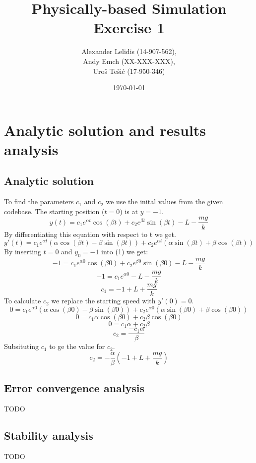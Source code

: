 \documentclass{article}
\title{Physically-based Simulation \\ Exercise 1}
\author{ 
    Alexander Lelidis (14-907-562), \\
    Andy Emch (XX-XXX-XXX), \\
    Uro\v{s} Te\v{s}i\'{c} (17-950-346)
}
\date{\today}
\begin{document}
\maketitle

\section{Analytic solution and results analysis}
\subsection{Analytic solution}
To find the parameters $c_1$ and $c_2$ we use the inital values from the given codebase. The starting position ($t = 0$) is at $y = -1$.
\begin{equation}
    y(t) = c_1 e^{\alpha  t} \cos(\beta t) + c_2 e^{\beta  t} \sin(\beta t) - L - \frac{mg}{k}
\end{equation}
By  differentiating this equation with respect to t we get.
\begin{equation}
    y'(t) = c_1 e^{\alpha  t} (\alpha \cos(\beta t) - \beta \sin(\beta t) )+ c_2 e^{\alpha  t} (\alpha \sin(\beta t) + \beta \cos(\beta t)) 
\end{equation}
By inserting $t = 0$ and $y_0 = -1$ into (1) we get:
\begin{equation}
    -1 = c_1 e^{\alpha  0} \cos(\beta 0) + c_2 e^{\beta  0} \sin(\beta 0) - L - \frac{mg}{k} 
\end{equation}
\begin{equation}
    -1 = c_1 e^{\alpha  0} - L - \frac{mg}{k} 
\end{equation}
\begin{equation}
    c_1 = -1 + L + \frac{mg}{k}
\end{equation}
To calculate $c_2$ we replace the starting speed with $y'(0) = 0$.
\begin{equation}
    0 = c_1 e^{\alpha  0} (\alpha \cos(\beta 0) - \beta \sin(\beta 0) )+ c_2 e^{\alpha  0} (\alpha \sin(\beta 0) + \beta \cos(\beta 0)) 
\end{equation}
\begin{equation}
    0 = c_1 \alpha \cos(\beta 0) + c_2  \beta \cos(\beta 0)
\end{equation}
\begin{equation}
    0 = c_1 \alpha + c_2  \beta
\end{equation}
\begin{equation}
    c_2 =  \frac{- c_1 \alpha}{  \beta}
\end{equation}
Subsituting $c_1$ to ge the value for $c_2$.
\begin{equation}
    c_2 =  - \frac{ \alpha}{  \beta} (-1 + L + \frac{mg}{k})
\end{equation}

\subsection{Error convergence analysis}
TODO

\subsection{Stability analysis}
TODO
\end{document}
